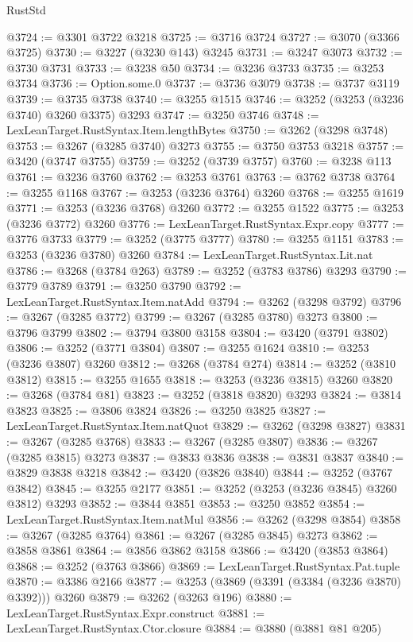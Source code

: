 \begin{lexlean}{RustStd}
\begin{coremodule}
{\begin{coremodule}
{{{{{{{{{{{{{{{{{{{{{{{{{{{{{{{{{{{{{{{@3724 := @3301 @3722 @3218
@3725 := @3716 @3724
@3727 := @3070 (@3366 @3725)
@3730 := @3227 (@3230 @143) @3245
@3731 := @3247 @3073
@3732 := @3730 @3731
@3733 := @3238 @50
@3734 := @3236 @3733
@3735 := @3253 @3734
@3736 := Option.some.{0}
@3737 := @3736 @3079
@3738 := @3737 @3119
@3739 := @3735 @3738
@3740 := @3255 @1515
@3746 := @3252 (@3253 (@3236 @3740) @3260 @3375) @3293
@3747 := @3250 @3746
@3748 := LexLeanTarget.RustSyntax.Item.lengthBytes
@3750 := @3262 (@3298 @3748)
@3753 := @3267 (@3285 @3740) @3273
@3755 := @3750 @3753 @3218
@3757 := @3420 (@3747 @3755)
@3759 := @3252 (@3739 @3757)
@3760 := @3238 @113
@3761 := @3236 @3760
@3762 := @3253 @3761
@3763 := @3762 @3738
@3764 := @3255 @1168
@3767 := @3253 (@3236 @3764) @3260
@3768 := @3255 @1619
@3771 := @3253 (@3236 @3768) @3260
@3772 := @3255 @1522
@3775 := @3253 (@3236 @3772) @3260
@3776 := LexLeanTarget.RustSyntax.Expr.copy
@3777 := @3776 @3733
@3779 := @3252 (@3775 @3777)
@3780 := @3255 @1151
@3783 := @3253 (@3236 @3780) @3260
@3784 := LexLeanTarget.RustSyntax.Lit.nat
@3786 := @3268 (@3784 @263)
@3789 := @3252 (@3783 @3786) @3293
@3790 := @3779 @3789
@3791 := @3250 @3790
@3792 := LexLeanTarget.RustSyntax.Item.natAdd
@3794 := @3262 (@3298 @3792)
@3796 := @3267 (@3285 @3772)
@3799 := @3267 (@3285 @3780) @3273
@3800 := @3796 @3799
@3802 := @3794 @3800 @3158
@3804 := @3420 (@3791 @3802)
@3806 := @3252 (@3771 @3804)
@3807 := @3255 @1624
@3810 := @3253 (@3236 @3807) @3260
@3812 := @3268 (@3784 @274)
@3814 := @3252 (@3810 @3812)
@3815 := @3255 @1655
@3818 := @3253 (@3236 @3815) @3260
@3820 := @3268 (@3784 @81)
@3823 := @3252 (@3818 @3820) @3293
@3824 := @3814 @3823
@3825 := @3806 @3824
@3826 := @3250 @3825
@3827 := LexLeanTarget.RustSyntax.Item.natQuot
@3829 := @3262 (@3298 @3827)
@3831 := @3267 (@3285 @3768)
@3833 := @3267 (@3285 @3807)
@3836 := @3267 (@3285 @3815) @3273
@3837 := @3833 @3836
@3838 := @3831 @3837
@3840 := @3829 @3838 @3218
@3842 := @3420 (@3826 @3840)
@3844 := @3252 (@3767 @3842)
@3845 := @3255 @2177
@3851 := @3252 (@3253 (@3236 @3845) @3260 @3812) @3293
@3852 := @3844 @3851
@3853 := @3250 @3852
@3854 := LexLeanTarget.RustSyntax.Item.natMul
@3856 := @3262 (@3298 @3854)
@3858 := @3267 (@3285 @3764)
@3861 := @3267 (@3285 @3845) @3273
@3862 := @3858 @3861
@3864 := @3856 @3862 @3158
@3866 := @3420 (@3853 @3864)
@3868 := @3252 (@3763 @3866)
@3869 := LexLeanTarget.RustSyntax.Pat.tuple
@3870 := @3386 @2166
@3877 := @3253 (@3869 (@3391 (@3384 (@3236 @3870) @3392))) @3260
@3879 := @3262 (@3263 @196)
@3880 := LexLeanTarget.RustSyntax.Expr.construct
@3881 := LexLeanTarget.RustSyntax.Ctor.closure
@3884 := @3880 (@3881 @81 @205)
}}}}}}}}}}}}}}}}}}}}}}}}}}}}}}}}}}}}}}}
\end{coremodule}}
\end{coremodule}
\end{lexlean}
